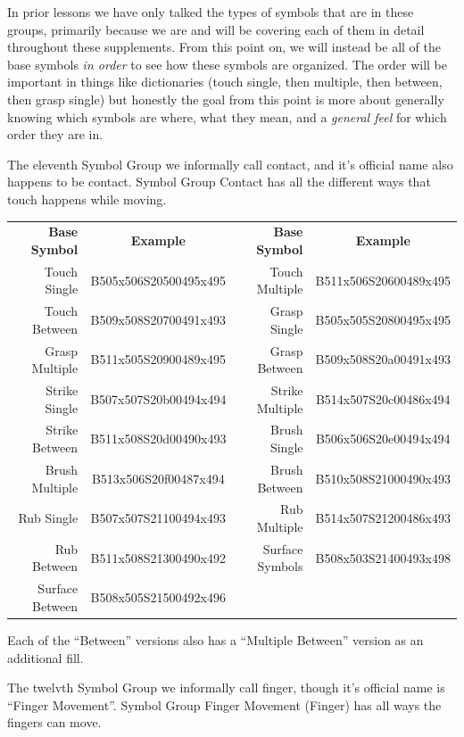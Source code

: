 \documentclass{article}
\begin{document}
In prior lessons we have only talked the types of symbols that are in these groups, primarily because we are and will be covering each of them in detail throughout these supplements.
From this point on, we will instead be all of the base symbols \emph{in order} to see how these symbols are organized.
The order will be important in things like dictionaries (touch single, then multiple, then between, then grasp single) but honestly the goal from this point is more about generally knowing which symbols are where, what they mean, and a \emph{general feel} for which order they are in.

The eleventh Symbol Group we informally call contact, and it's official name also happens to be contact.
Symbol Group Contact has all the different ways that touch happens while moving.

\begin{center}
\begin{tabular}{rcrc}
\textbf{Base Symbol}&\textbf{Example}&\textbf{Base Symbol}&\textbf{Example}\\
Touch Single   &B505x506S20500495x495&Touch Multiple &B511x506S20600489x495\\
Touch Between  &B509x508S20700491x493&Grasp Single   &B505x505S20800495x495\\
Grasp Multiple &B511x505S20900489x495&Grasp Between  &B509x508S20a00491x493\\
Strike Single  &B507x507S20b00494x494&Strike Multiple&B514x507S20c00486x494\\
Strike Between &B511x508S20d00490x493&Brush Single   &B506x506S20e00494x494\\
Brush Multiple &B513x506S20f00487x494&Brush Between  &B510x508S21000490x493\\
Rub Single     &B507x507S21100494x493&Rub Multiple   &B514x507S21200486x493\\
Rub Between    &B511x508S21300490x492&Surface Symbols&B508x503S21400493x498\\
Surface Between&B508x505S21500492x496\\
\end{tabular}
\end{center}

Each of the ``Between'' versions also has a ``Multiple Between'' version as an additional fill.

The twelvth Symbol Group we informally call finger, though it's official name is ``Finger Movement''.
Symbol Group Finger Movement (Finger) has all ways the fingers can move.
\end{document}
